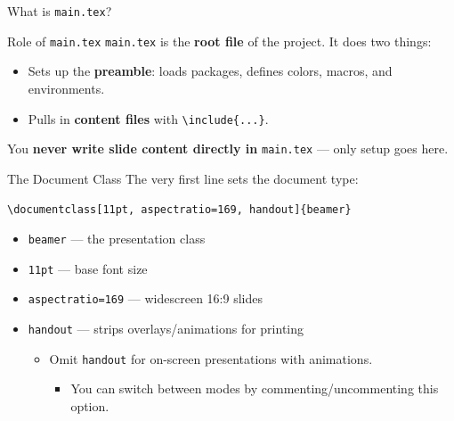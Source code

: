 
\blueheader
\begin{frame}{What is \texttt{main.tex}?}
\begin{bluebox*}{Role of \texttt{main.tex}}{}
  \texttt{main.tex} is the \textbf{root file} of the project. It does two things:
  \begin{itemize}
    \item Sets up the \textbf{preamble}: loads packages, defines colors, macros, and environments.
    \item Pulls in \textbf{content files} with \texttt{\textbackslash include\{...\}}.
  \end{itemize}
\end{bluebox*}
\medskip
You \textbf{never write slide content directly in} \texttt{main.tex} --- only setup goes here.
\end{frame}

\blueheader
\begin{frame}{The Document Class}
The very first line sets the document type:
\medskip
\begin{bluefocus}
\texttt{\textbackslash documentclass[11pt, aspectratio=169, handout]\{beamer\}}
\end{bluefocus}
\medskip
\begin{itemize}
  \item \texttt{beamer} --- the presentation class
  \item \texttt{11pt} --- base font size
  \item \texttt{aspectratio=169} --- widescreen 16:9 slides
  \item \texttt{handout} --- strips overlays/animations for printing
  \begin{itemize}
    \item Omit \texttt{handout} for on-screen presentations with animations.
    \begin{itemize}
      \item You can switch between modes by commenting/uncommenting this option.
    \end{itemize}
  \end{itemize}
\end{itemize}
\end{frame}

